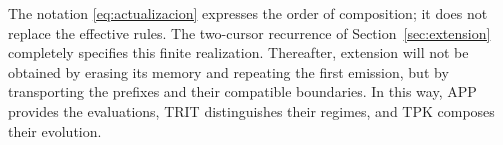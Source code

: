 The notation \eqref{eq:actualizacion} expresses the order of composition; it does not
replace the effective rules. The two-cursor recurrence of
Section~\ref{sec:extension} completely specifies this finite realization.
Thereafter, extension will not be obtained by erasing its memory and repeating the
first emission, but by transporting the prefixes and their compatible boundaries.
In this way, APP provides the evaluations, TRIT distinguishes their regimes,
and TPK composes their evolution.




